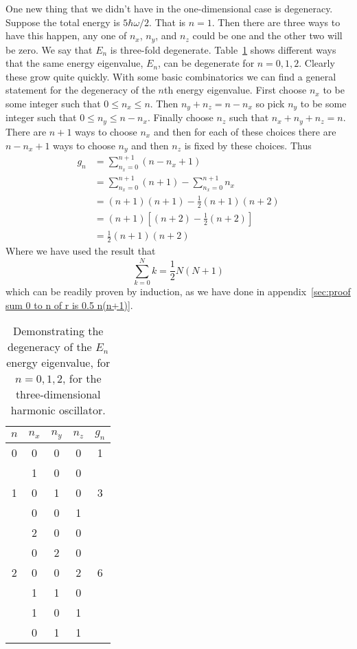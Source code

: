     One new thing that we didn't have in the one-dimensional case is degeneracy.
    Suppose the total energy is \(5\hbar\omega/2\).
    That is \(n = 1\).
    Then there are three ways to have this happen, any one of \(n_x\), \(n_y\), and \(n_z\) could be one and the other two will be zero.
    We say that \(E_n\) is three-fold degenerate.
    Table~\ref{tab:degeneracy 3D HO} shows different ways that the same energy eigenvalue, \(E_n\), can be degenerate for \(n = 0, 1, 2\).
    Clearly these grow quite quickly.
    With some basic combinatorics we can find a general statement for the degeneracy of the \(n\)th energy eigenvalue.
    First choose \(n_x\) to be some integer such that \(0 \le n_x \le n\).
    Then \(n_y + n_z = n - n_x\) so pick \(n_y\) to be some integer such that \(0 \le n_y \le n - n_x\).
    Finally choose \(n_z\) such that \(n_x + n_y + n_z = n\).
    There are \(n + 1\) ways to choose \(n_x\) and then for each of these choices there are \(n - n_x + 1\) ways to choose \(n_y\) and then \(n_z\) is fixed by these choices.
    Thus
    \begin{align*}
        g_n &= \sum_{n_x = 0}^{n+1}(n - n_x + 1)\\
        &= \sum_{n_x = 0}^{n+1}(n + 1) - \sum_{n_x = 0}^{n+1}n_x\\
        &= (n+1)(n+1) - \frac{1}{2}(n+1)(n+2)\\
        &= (n+1)\left[(n+2) - \frac{1}{2}(n+2)\right]\\
        &= \frac{1}{2}(n+1)(n+2)
    \end{align*}
    Where we have used the result that
    \[\sum_{k=0}^{N}k = \frac{1}{2}N(N + 1)\]
    which can be readily proven by induction, as we have done in appendix~\ref{sec:proof sum 0 to n of r is 0.5 n(n+1)}.
    \begin{table}
        \centering
        \begin{tabular}{ccccc}
        	\hline\hline
        	\(n\) & \(n_x\) & \(n_y\) & \(n_z\) & \(g_n\) \\\hline\hline
        	  0   &    0    &    0    &    0    &    1\\\hline
                  &    1    &    0    &    0    &\\
              1   &    0    &    1    &    0    &    3\\
                  &    0    &    0    &    1    &\\\hline
                  &    2    &    0    &    0    &\\
                  &    0    &    2    &    0    &\\
              2   &    0    &    0    &    2    &    6\\
                  &    1    &    1    &    0    &\\
                  &    1    &    0    &    1    &\\
                  &    0    &    1    &    1    &\\\hline\hline
        \end{tabular}
        \caption{Demonstrating the degeneracy of the \(E_n\) energy eigenvalue, for \(n = 0, 1, 2\), for the three-dimensional harmonic oscillator.}
        \label{tab:degeneracy 3D HO}
    \end{table}

